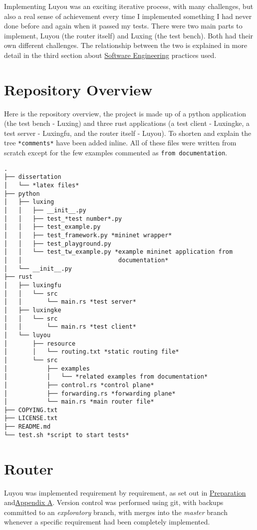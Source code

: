 \documentclass[12pt,a4paper,twoside,openright]{report}
\begin{document}
Implementing Luyou was an exciting iterative process, with many challenges, but also a real sense of achievement every time I implemented something I had never done before and again when it passed my tests.  There were two main parts to implement, Luyou (the router itself) and Luxing (the test bench).  Both had their own different challenges.  The relationship between the two is explained in more detail in the third section about \hyperref[sec::soft_eng] {Software Engineering} practices used.


\section*{Repository Overview}

Here is the repository overview, the project is made up of a python application (the test bench - Luxing) and three rust applications (a test client - Luxingke, a test server - Luxingfu, and the router itself - Luyou). To shorten and explain the tree \verb!*comments*! have been added inline. All of these files were written from scratch except for the few examples commented as \verb!from documentation!.

\begin{lstlisting}[style=tree]
.
├── dissertation
│   └── *latex files*
├── python
│   ├── luxing
│   │   ├── __init__.py
│   │   ├── test_*test number*.py
│   │   ├── test_example.py
│   │   ├── test_framework.py *mininet wrapper*
│   │   ├── test_playground.py 
│   │   └── test_tw_example.py *example mininet application from
│   │                           documentation*
│   └── __init__.py
├── rust
│   ├── luxingfu
│   │   └── src
│   │       └── main.rs *test server*
│   ├── luxingke
│   │   └── src
│   │       └── main.rs *test client*
│   └── luyou
│       ├── resource
│       │   └── routing.txt *static routing file*
│       └── src
│           ├── examples
│           │   └── *related examples from documentation*
│           ├── control.rs *control plane*
│           ├── forwarding.rs *forwarding plane*
│           └── main.rs *main router file*
├── COPYING.txt
├── LICENSE.txt
├── README.md
└── test.sh *script to start tests*
\end{lstlisting}


\section{Router}
\label{sec::router}

Luyou was implemented requirement by requirement, as set out in \hyperref[chap::preparation]{Preparation} and\hyperref[appendix::requirements]{Appendix A}.  Version control was performed using git, with backups committed to an \textit{exploratory} branch, with merges into the \textit{master} branch whenever a specific requirement had been completely implemented.
\end{document}
